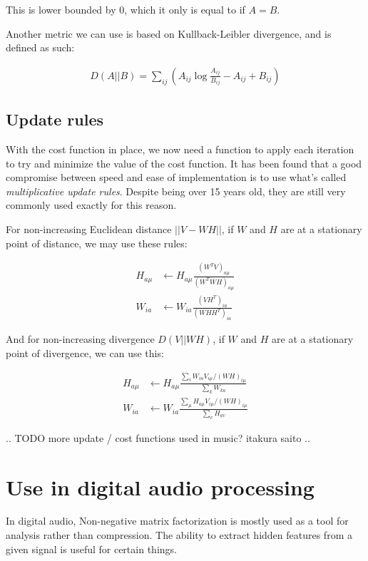 This is lower bounded by 0, which it only is equal to if $A = B$.

Another metric we can use is based on Kullback-Leibler divergence, and is defined as such: \cite{nmf_algorithms}

\begin{align}
D(A||B) = \sum_{ij} \left( A_{ij} \log \frac{A_{ij}}{B_{ij}} - A_{ij} + B_{ij} \right)
\end{align}

\subsection{Update rules}
With the cost function in place, we now need a function to apply each iteration to try and minimize the value of the cost function. It has been found that a good compromise between speed and ease of implementation is to use what's called \emph{multiplicative update rules}. \cite{nmf_algorithms} Despite being over 15 years old, they are still very commonly used exactly for this reason.

For non-increasing Euclidean distance $||V - WH||$, if $W$ and $H$ are at a stationary point of distance, we may use these rules:

\begin{align}
H_{a \mu} & \leftarrow H_{a \mu} \frac{(W^TV)_{a \mu}}{(W^TWH)_{a \mu}} \\
W_{ia} & \leftarrow W_{ia} \frac{(VH^T)_{ia}}{(WHH^T)_{ia}}
\end{align}

And for non-increasing divergence $D(V||WH)$, if $W$ and $H$ are at a stationary point of divergence, we can use this:

\begin{align}
H_{a \mu} & \leftarrow H_{a \mu} \frac{\sum_i W_{ia} V_{i \mu} / (WH)_{i \mu}}{\sum_k W_{ka}} \\
W_{ia} & \leftarrow W_{ia} \frac{\sum_\mu H_{a \mu} V_{i \mu} / (WH)_{i \mu}}{\sum_v H_{av}}
\end{align}

.. TODO more update / cost functions used in music? itakura saito ..

\section{Use in digital audio processing}
In digital audio, Non-negative matrix factorization is mostly used as a tool for analysis rather than compression. The ability to extract hidden features from a given signal is useful for certain things.

